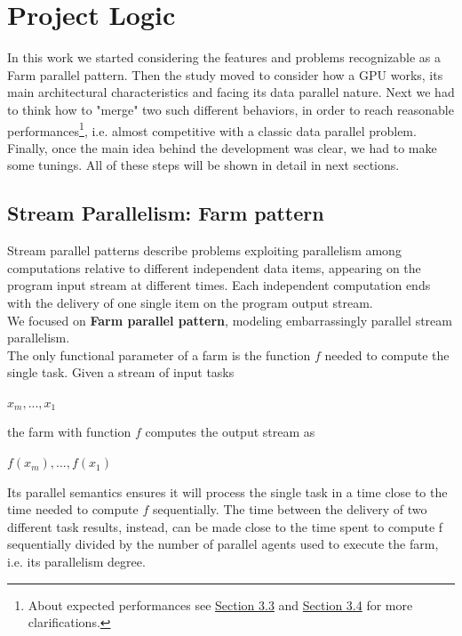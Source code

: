 \chapter{Project Logic}
\label{chap:logic}

In this work we started considering the features and problems recognizable as a Farm parallel pattern.
Then the study moved to consider how a GPU works, its main architectural characteristics and facing its data parallel nature.
Next we had to think how to "merge" two such different behaviors, in order to reach reasonable performances\footnote{About expected performances see \hyperref[sect:overallLogic]{Section 3.3} and \hyperref[sect:tunings]{Section 3.4} for more clarifications.}, i.e. almost competitive with a classic data parallel problem.
Finally, once the main idea behind the development was clear, we had to make some tunings.
All of these steps will be shown in detail in next sections.

\section{Stream Parallelism: Farm pattern}

	Stream parallel patterns describe problems exploiting parallelism among computations relative to different independent data items, appearing on the program input stream at different times.
	Each independent computation ends with the delivery of one single item on the program output stream.\\
	We focused on \textbf{Farm parallel pattern}, modeling embarrassingly parallel stream parallelism.\\
	The only functional parameter of a farm is the function \(f\) needed to compute the single task\cite{spm}.
	Given a stream of input tasks 
	\begin{center}
		\(x_m , . . . , x_1\)\\
	\end{center}
	the farm with function \(f\) computes the output stream as
	\begin{center}
		\(f ( x_m ), . . . , f ( x_1 )\)
	\end{center}
	Its parallel semantics ensures it will process the single task in a time close to the time needed to compute \(f\) sequentially. The time between the delivery of two different task results, instead, can be made close to the time spent to compute f sequentially divided by the number of parallel agents used to execute the farm, i.e. its parallelism degree\cite{spm,parpattbench}.\\


